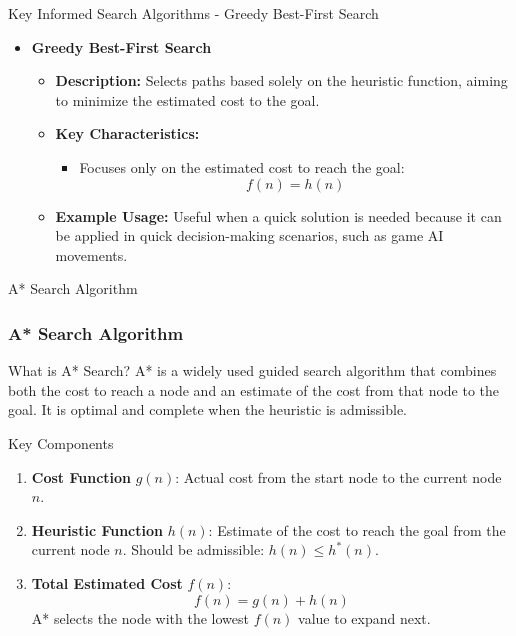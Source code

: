 \documentclass[aspectratio=169]{beamer}
\begin{document}
\begin{frame}[fragile]{Key Informed Search Algorithms - Greedy Best-First Search}
    \begin{itemize}
        \item \textbf{Greedy Best-First Search}
        \begin{itemize}
            \item \textbf{Description:} Selects paths based solely on the heuristic function, aiming to minimize the estimated cost to the goal.
            \item \textbf{Key Characteristics:}
            \begin{itemize}
                \item Focuses only on the estimated cost to reach the goal:
                \begin{equation}
                    f(n) = h(n)
                \end{equation}
            \end{itemize}
            \item \textbf{Example Usage:} Useful when a quick solution is needed because it can be applied in quick decision-making scenarios, such as game AI movements.
        \end{itemize}
    \end{itemize}
\end{frame}

\begin{frame}{A* Search Algorithm}
    \frametitle{A* Search Algorithm}
    \begin{block}{What is A* Search?}
        A* is a widely used guided search algorithm that combines both the cost to reach a node and an estimate of the cost from that node to the goal. It is optimal and complete when the heuristic is admissible.
    \end{block}
\end{frame}

\begin{frame}{Key Components}
    \begin{enumerate}
        \item \textbf{Cost Function} $g(n)$: Actual cost from the start node to the current node $n$.
        \item \textbf{Heuristic Function} $h(n)$: Estimate of the cost to reach the goal from the current node $n$. Should be admissible: $h(n) \leq h^*(n)$.
        \item \textbf{Total Estimated Cost} $f(n)$: 
        \begin{equation}
          f(n) = g(n) + h(n)
        \end{equation}
        A* selects the node with the lowest $f(n)$ value to expand next.
    \end{enumerate}
\end{frame}
\end{document}
